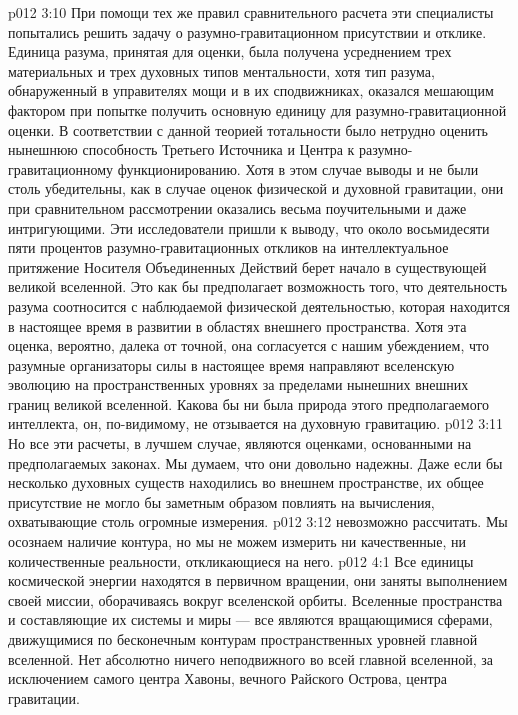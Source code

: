 \vs p012 3:10 \bibnobreakspace {} При помощи тех же правил сравнительного расчета эти специалисты попытались решить задачу о разумно\hyp{}гравитационном присутствии и отклике. Единица разума, принятая для оценки, была получена усреднением трех материальных и трех духовных типов ментальности, хотя тип разума, обнаруженный в управителях мощи и в их сподвижниках, оказался мешающим фактором при попытке получить основную единицу для разумно\hyp{}гравитационной оценки. В соответствии с данной теорией тотальности было нетрудно оценить нынешнюю способность Третьего Источника и Центра к разумно\hyp{}гравитационному функционированию. Хотя в этом случае выводы и не были столь убедительны, как в случае оценок физической и духовной гравитации, они при сравнительном рассмотрении оказались весьма поучительными и даже интригующими. Эти исследователи пришли к выводу, что около восьмидесяти пяти процентов разумно\hyp{}гравитационных откликов на интеллектуальное притяжение Носителя Объединенных Действий берет начало в существующей великой вселенной. Это как бы предполагает возможность того, что деятельность разума соотносится с наблюдаемой физической деятельностью, которая находится в настоящее время в развитии в областях внешнего пространства. Хотя эта оценка, вероятно, далека от точной, она согласуется с нашим убеждением, что разумные организаторы силы в настоящее время направляют вселенскую эволюцию на пространственных уровнях за пределами нынешних внешних границ великой вселенной. Какова бы ни была природа этого предполагаемого интеллекта, он, по\hyp{}видимому, не отзывается на духовную гравитацию.
\vs p012 3:11 Но все эти расчеты, в лучшем случае, являются оценками, основанными на предполагаемых законах. Мы думаем, что они довольно надежны. Даже если бы несколько духовных существ находились во внешнем пространстве, их общее присутствие не могло бы заметным образом повлиять на вычисления, охватывающие столь огромные измерения.
\vs p012 3:12 \pc {} невозможно рассчитать. Мы осознаем наличие контура, но мы не можем измерить ни качественные, ни количественные реальности, откликающиеся на него.
\vs p012 4:1 Все единицы космической энергии находятся в первичном вращении, они заняты выполнением своей миссии, оборачиваясь вокруг вселенской орбиты. Вселенные пространства и составляющие их системы и миры --- все являются вращающимися сферами, движущимися по бесконечным контурам пространственных уровней главной вселенной. Нет абсолютно ничего неподвижного во всей главной вселенной, за исключением самого центра Хавоны, вечного Райского Острова, центра гравитации.

